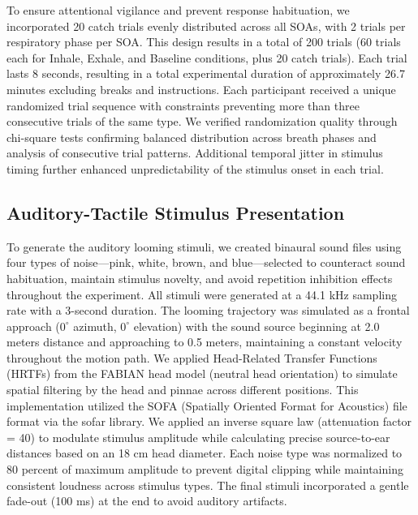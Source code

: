 To ensure attentional vigilance and prevent response habituation, we incorporated 20 catch trials evenly distributed across all SOAs, with 2 trials per respiratory phase per SOA. This design results in a total of 200 trials (60 trials each for Inhale, Exhale, and Baseline conditions, plus 20 catch trials). Each trial lasts 8 seconds, resulting in a total experimental duration of approximately 26.7 minutes excluding breaks and instructions. Each participant received a unique randomized trial sequence with constraints preventing more than three consecutive trials of the same type. We verified randomization quality through chi-square tests confirming balanced distribution across breath phases and analysis of consecutive trial patterns. Additional temporal jitter in stimulus timing further enhanced unpredictability of the stimulus onset in each trial.

\subsection{Auditory-Tactile Stimulus Presentation}
To generate the auditory looming stimuli, we created binaural sound files using four types of noise---pink, white, brown, and blue---selected to counteract sound habituation, maintain stimulus novelty, and avoid repetition inhibition effects throughout the experiment. All stimuli were generated at a 44.1 kHz sampling rate with a 3-second duration. The looming trajectory was simulated as a frontal approach ($0^\circ$ azimuth, $0^\circ$ elevation) with the sound source beginning at 2.0 meters distance and approaching to 0.5 meters, maintaining a constant velocity throughout the motion path. We applied Head-Related Transfer Functions (HRTFs) from the FABIAN head model (neutral head orientation) \citep{brinkmann2017fabian} to simulate spatial filtering by the head and pinnae across different positions. This implementation utilized the SOFA (Spatially Oriented Format for Acoustics) file format via the sofar library. We applied an inverse square law (attenuation factor = 40) to modulate stimulus amplitude while calculating precise source-to-ear distances based on an 18 cm head diameter. Each noise type was normalized to 80 percent of maximum amplitude to prevent digital clipping while maintaining consistent loudness across stimulus types. The final stimuli incorporated a gentle fade-out (100 ms) at the end to avoid auditory artifacts.

